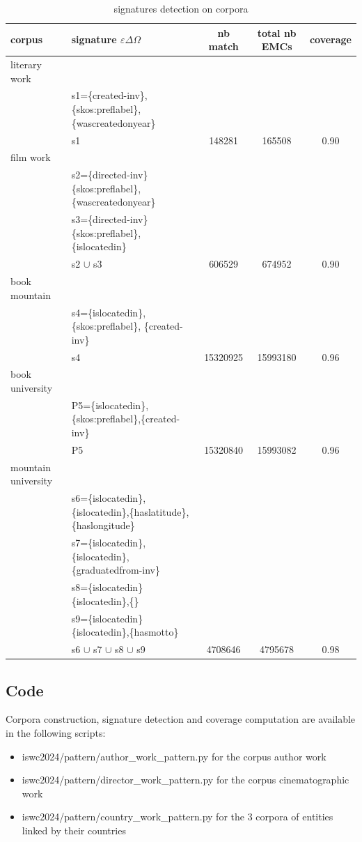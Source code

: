 \documentclass[runningheads]{llncs}
\begin{document}
\begin{table}[]
    \centering
    \begin{tabular}{l|l|c|c|c}
        \hline
         corpus & signature $\varepsilon\Delta\Omega$ & nb match & total nb EMCs & coverage   \\
         \hline
       literary work  & & & & \\
         & s1=\{created-inv\},\{skos:preflabel\},\{wascreatedonyear\}& & & \\
       \hline  
       & s1 & 148281 & 165508 & 0.90\\
       \hline
       film work & & & & \\  
       & s2=\{directed-inv\}\{skos:preflabel\},\{wascreatedonyear\} & & & \\
       & s3=\{directed-inv\}\{skos:preflabel\},\{islocatedin\} & & & \\
       \hline
        & s2 $\cup$ s3 & 606529 & 674952 & 0.90\\
       \hline
       \hline
       book mountain & & & & \\  
       & s4=\{islocatedin\},\{skos:preflabel\}, \{created-inv\}& & & \\
       \hline
       & s4 & 15320925 & 15993180 & 0.96\\
       \hline
       book university & & & &  \\
       & P5=\{islocatedin\},\{skos:preflabel\},\{created-inv\}& & & \\
       \hline
       & P5 & 15320840 & 15993082 & 0.96 \\
       \hline
       mountain university  & & & & \\
       & s6=\{islocatedin\},\{islocatedin\},\{haslatitude\}, \{haslongitude\}& & & \\
       &s7=\{islocatedin\},\{islocatedin\},\{graduatedfrom-inv\}& & & \\
       &s8=\{islocatedin\}\{islocatedin\},\{\}& & & \\
       &s9=\{islocatedin\}\{islocatedin\},\{hasmotto\}& & & \\
       \hline
       &s6 $\cup$ s7 $\cup$ s8 $\cup$ s9 & 4708646 & 4795678& 0.98\\
       \hline
    \end{tabular}
    \caption{signatures detection on corpora}
    \label{tab:signature_detection}
\end{table}

\subsection{Code}
Corpora construction, signature detection and coverage computation are available in the following scripts:
\begin{itemize}
	\item iswc2024/pattern/author\_work\_pattern.py for the corpus author work
	\item iswc2024/pattern/director\_work\_pattern.py for the corpus cinematographic work
	\item iswc2024/pattern/country\_work\_pattern.py for the 3 corpora of entities linked by their countries 
\end{itemize}
\end{document}
